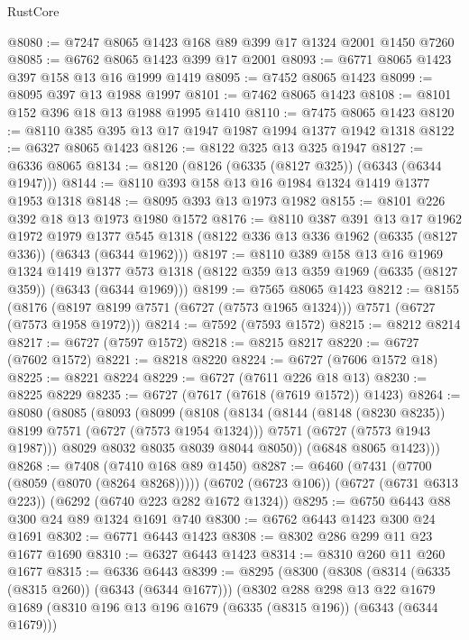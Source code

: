 \begin{lexlean}{RustCore}
\begin{coremodule}
@8080 := @7247 @8065 @1423 @168 @89 @399 @17 @1324 @2001 @1450 @7260
@8085 := @6762 @8065 @1423 @399 @17 @2001
@8093 := @6771 @8065 @1423 @397 @158 @13 @16 @1999 @1419
@8095 := @7452 @8065 @1423
@8099 := @8095 @397 @13 @1988 @1997
@8101 := @7462 @8065 @1423
@8108 := @8101 @152 @396 @18 @13 @1988 @1995 @1410
@8110 := @7475 @8065 @1423
@8120 := @8110 @385 @395 @13 @17 @1947 @1987 @1994 @1377 @1942 @1318
@8122 := @6327 @8065 @1423
@8126 := @8122 @325 @13 @325 @1947
@8127 := @6336 @8065
@8134 := @8120 (@8126 (@6335 (@8127 @325)) (@6343 (@6344 @1947)))
@8144 := @8110 @393 @158 @13 @16 @1984 @1324 @1419 @1377 @1953 @1318
@8148 := @8095 @393 @13 @1973 @1982
@8155 := @8101 @226 @392 @18 @13 @1973 @1980 @1572
@8176 := @8110
    @387
    @391
    @13
    @17
    @1962
    @1972
    @1979
    @1377
    @545
    @1318
    (@8122 @336 @13 @336 @1962 (@6335 (@8127 @336)) (@6343 (@6344 @1962)))
@8197 := @8110
    @389
    @158
    @13
    @16
    @1969
    @1324
    @1419
    @1377
    @573
    @1318
    (@8122 @359 @13 @359 @1969 (@6335 (@8127 @359)) (@6343 (@6344 @1969)))
@8199 := @7565 @8065 @1423
@8212 := @8155
    (@8176 (@8197 @8199 @7571 (@6727 (@7573 @1965 @1324))) @7571 (@6727 (@7573 @1958 @1972)))
@8214 := @7592 (@7593 @1572)
@8215 := @8212 @8214
@8217 := @6727 (@7597 @1572)
@8218 := @8215 @8217
@8220 := @6727 (@7602 @1572)
@8221 := @8218 @8220
@8224 := @6727 (@7606 @1572 @18)
@8225 := @8221 @8224
@8229 := @6727 (@7611 @226 @18 @13)
@8230 := @8225 @8229
@8235 := @6727 (@7617 (@7618 (@7619 @1572)) @1423)
@8264 := @8080
    (@8085
      (@8093
        (@8099
          (@8108
            (@8134
              (@8144 (@8148 (@8230 @8235)) @8199 @7571 (@6727 (@7573 @1954 @1324)))
              @7571
              (@6727 (@7573 @1943 @1987)))
            @8029
            @8032
            @8035
            @8039
            @8044
            @8050))
        (@6848 @8065 @1423)))
@8268 := @7408 (@7410 @168 @89 @1450)
@8287 := @6460
    (@7431 (@7700 (@8059 (@8070 (@8264 @8268)))))
    (@6702 (@6723 @106))
    (@6727 (@6731 @6313 @223))
    (@6292 (@6740 @223 @282 @1672 @1324))
@8295 := @6750 @6443 @88 @300 @24 @89 @1324 @1691 @740
@8300 := @6762 @6443 @1423 @300 @24 @1691
@8302 := @6771 @6443 @1423
@8308 := @8302 @286 @299 @11 @23 @1677 @1690
@8310 := @6327 @6443 @1423
@8314 := @8310 @260 @11 @260 @1677
@8315 := @6336 @6443
@8399 := @8295
    (@8300
      (@8308
        (@8314 (@6335 (@8315 @260)) (@6343 (@6344 @1677)))
        (@8302
          @288
          @298
          @13
          @22
          @1679
          @1689
          (@8310 @196 @13 @196 @1679 (@6335 (@8315 @196)) (@6343 (@6344 @1679)))

\end{coremodule}
\end{lexlean}
